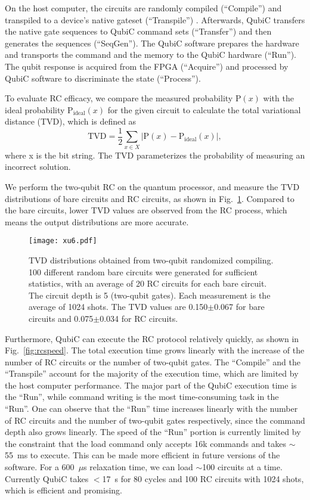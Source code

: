 \documentclass{ieeetran}
\begin{document}
On the host computer, the circuits are randomly compiled (``Compile'') and transpiled to a device's native gateset (``Transpile'') \cite{hashim2020randomized,trueq2020}.
Afterwards, QubiC transfers the native gate sequences to QubiC command sets (``Transfer'') and then generates the sequences (``SeqGen''). 
The QubiC software prepares the hardware and transports the command and the memory to the QubiC hardware (``Run''). 
The qubit response is acquired from the FPGA (``Acquire'') and processed by QubiC software to discriminate the state (``Process''). 

To evaluate RC efficacy, we compare the measured probability $\mathrm{P}(x)$ with the ideal probability $\mathrm{P}_\mathrm{ideal}(x)$ for the given circuit to calculate the total variational distance (TVD), which is defined as
\begin{equation}
\label{eq3}
\mathrm{TVD}=\frac{1}{2}\sum_{x \in X}|\mathrm{P}(x)-\mathrm{P}_\mathrm{ideal}(x)| ,
\end{equation}
where x is the bit string. 
The TVD parameterizes the probability of measuring an incorrect solution.

We perform the two-qubit RC on the quantum processor, and measure the TVD distributions of bare circuits and RC circuits, as shown in Fig.~\ref{fig:rcdist}. 
Compared to the bare circuits, lower TVD values are observed from the RC process, which means the output distributions are more accurate.

\begin{figure}[!ht]
\centering
\texttt{[image: xu6.pdf]} 
\caption{TVD distributions obtained from two-qubit randomized compiling. 100 different random bare circuits were generated for sufficient statistics, with an average of 20 RC circuits for each bare circuit. The circuit depth is 5 (two-qubit gates). Each measurement is the average of 1024 shots. The TVD values are 0.150$\pm$0.067 for bare circuits and 0.075$\pm$0.034 for RC circuits.}
\label{fig:rcdist}
\end{figure}

Furthermore, QubiC can execute the RC protocol relatively quickly, as shown in Fig.~\ref{fig:rcspeed}.
The total execution time grows linearly with the increase of the number of RC circuits or the number of two-qubit gates.
The ``Compile'' and the ``Transpile'' account for the majority of the execution time, which are limited by the host computer performance.
The major part of the QubiC execution time is the ``Run'', while command writing is the most time-consuming task in the ``Run''. 
One can observe that the ``Run'' time increases linearly with the number of RC circuits and the number of two-qubit gates respectively, since the command depth also grows linearly. 
The speed of the ``Run'' portion is currently limited by the constraint that the load command only accepts 16k commands and takes $\sim$55~ms to execute. 
This can be made more efficient in future versions of the software.
For a 600~$\mu$s relaxation time, we can load $\sim$100 circuits at a time. 
Currently QubiC takes $<$17~s for 80 cycles and 100 RC circuits with 1024 shots, which is efficient and promising.
\end{document}
